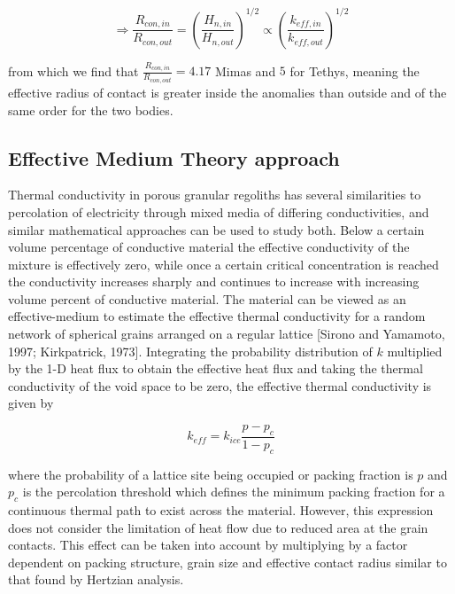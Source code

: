 \documentclass[11pt]{article} %
\begin{document}
	\begin{equation}
	\Rightarrow \frac{R_{con,in}}{R_{con,out}} = (\frac{H_{n, in}}{H_{n, out}})^{1/2} \varpropto \left( \frac{k_{eff,in}}{k_{eff,out}} \right)^{1/2}
	\end{equation}
	
	from which we find that $\frac{R_{con,in}}{R_{con,out}} = 4.17$ Mimas and $5$ for Tethys, meaning the effective radius of contact is greater inside the anomalies than outside and of the same order for the two bodies.
	
\subsection{Effective Medium Theory approach}

	Thermal conductivity in porous granular regoliths has several similarities to percolation of electricity through mixed media of differing conductivities, and similar mathematical approaches can be used to study both. Below a certain volume percentage of conductive material the effective conductivity of the mixture is effectively zero, while once a certain critical concentration is reached the conductivity increases sharply and continues to increase with increasing volume percent of conductive material. The material can be viewed as an effective-medium to estimate the effective thermal conductivity for a random network of spherical grains arranged on a regular lattice  [Sirono and Yamamoto, 1997; Kirkpatrick, 1973]. Integrating the probability distribution of $k$ multiplied by the 1-D heat flux to obtain the effective heat flux and taking the thermal conductivity of the void space to be zero, the effective thermal conductivity is given by
	
	\begin{equation}
	k_{eff} = k_{ice} \frac{p - p_{c}}{1 - p_{c}}
	\end{equation}

	where the probability of a lattice site being occupied or packing fraction is $p$ and $p_{c}$ is the percolation threshold which defines the minimum packing fraction for a continuous thermal path to exist across the material. However, this expression does not consider the limitation of heat flow due to reduced area at the grain contacts. This effect can be taken into account by multiplying by a factor dependent on packing structure, grain size and effective contact radius similar to that found by Hertzian analysis.
	 
\end{document}
